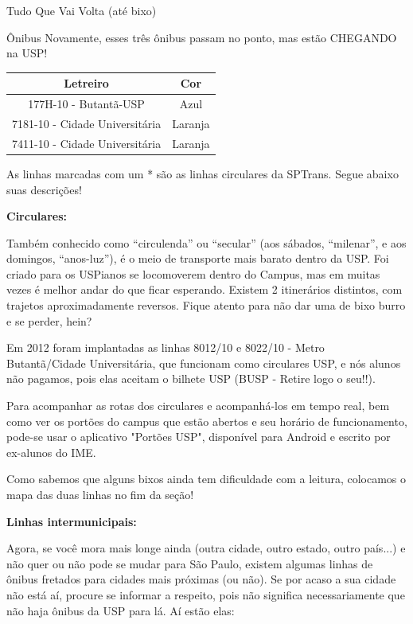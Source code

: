 \begin{secao}{Tudo Que Vai Volta (até bixo)}
\begin{subsecao}{Ônibus}
Novamente, esses três ônibus passam no ponto, mas estão CHEGANDO na USP!
\begin{center}
	\begin{tabular}{|c|c|}
	  \hline
	  Letreiro & Cor\\
	  \hline
	  177H-10 - Butantã-USP & Azul\\
	  7181-10 - Cidade Universitária & Laranja\\
	  7411-10 - Cidade Universitária & Laranja\\
	  \hline
	\end{tabular}
\end{center}

As linhas marcadas com um * são as linhas circulares da SPTrans. Segue abaixo suas descrições!

{\bf Circulares:}

Também conhecido como ``circulenda'' ou ``secular'' (aos sábados, ``milenar'', e aos domingos, ``anos-luz''), é o meio de transporte mais barato dentro da USP. Foi criado para os USPianos se locomoverem dentro do Campus, mas em muitas vezes é melhor andar do que ficar esperando. Existem 2 itinerários distintos, com trajetos aproximadamente reversos. Fique atento para não dar uma de bixo burro e se perder, hein?

Em 2012 foram implantadas as linhas 8012/10 e 8022/10 - Metro Butantã/Cidade Universitária,
que funcionam como circulares USP, e nós alunos não pagamos, pois elas aceitam o bilhete USP (BUSP - Retire logo o seu!!).

Para acompanhar as rotas dos circulares e acompanhá-los em tempo real, bem como
ver os portões do campus que estão abertos e seu horário de funcionamento, pode-se
usar o aplicativo "Portões USP", disponível para Android e escrito por ex-alunos
do IME.

Como sabemos que alguns bixos ainda tem dificuldade com a leitura, colocamos o
 mapa das duas linhas no fim da seção!


{\bf Linhas intermunicipais:}

Agora, se você mora mais longe ainda (outra cidade, outro estado, outro país...) e não quer ou não pode se mudar para São Paulo, existem algumas linhas de ônibus fretados para cidades mais próximas (ou não). Se por acaso a sua cidade não está aí, procure se informar a respeito, pois não significa necessariamente que não haja ônibus da USP para lá. Aí estão elas:


\end{subsecao}
\end{secao}
